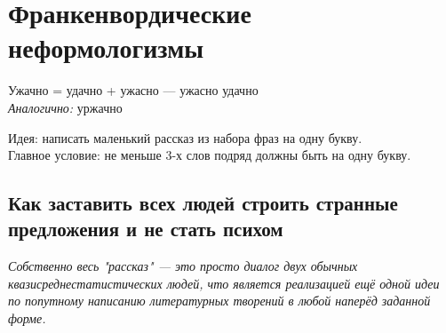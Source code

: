 \section{Франкенвордические неформологизмы}

Ужачно = удачно + ужасно --- ужасно удачно\\

\emph{Аналогично:} уржачно


Идея: написать маленький рассказ из набора фраз на одну букву.\\
Главное условие: не меньше 3-х слов подряд должны быть на одну букву.

\subsection{Как заставить всех людей строить странные предложения и не стать психом}
\emph{Собственно весь "рассказ" --- это просто диалог двух обычных квазисреднестатистических людей, что является реализацией ещё одной идеи по
попутному написанию литературных творений в любой наперёд заданной форме.}


